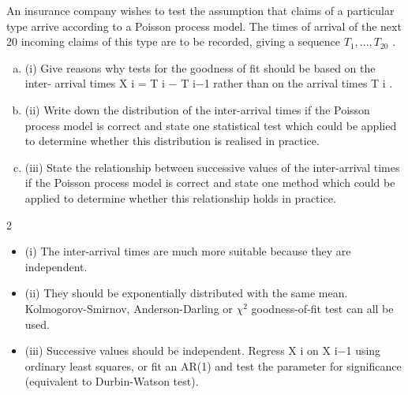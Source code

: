 \documentclass[a4paper,12pt]{article}
\begin{document}
 An insurance company wishes to test the assumption that claims of a particular
type arrive according to a Poisson process model. The times of arrival of the next
20 incoming claims of this type are to be recorded, giving a sequence $T_1 , ..., T_{20}$ .
\begin{enumerate}[(a)]
\item (i) Give reasons why tests for the goodness of fit should be based on the inter-
arrival times X i = T i − T i−1 rather than on the arrival times T i .
\item (ii) Write down the distribution of the inter-arrival times if the Poisson process model is correct and state one statistical test which could be
applied to determine whether this distribution is realised in practice.
\item 
(iii) State the relationship between successive values of the inter-arrival times if the Poisson process model is correct and state one method which could
be applied to determine whether this relationship holds in practice.
\end{enumerate}

\newpage


2
\begin{itemize}
\item (i) The inter-arrival times are much more suitable because they are independent.
\item (ii) They should be exponentially distributed with the same mean.
Kolmogorov-Smirnov, Anderson-Darling or $\chi^2$ goodness-of-fit test can all be used.
\item (iii)
Successive values should be independent.
Regress X i on X i−1 using ordinary least squares, or fit an AR(1) and test the  parameter for significance (equivalent to Durbin-Watson test).
\end{itemize}
\end{document}
